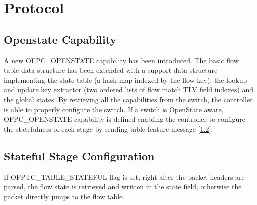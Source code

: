 \chapter{Protocol}
\label{chap:configuration}

\section{Openstate Capability}
\label{sec:capability}
A new OFPC\_OPENSTATE capability has been introduced.
The basic flow table data structure has been extended with a support data structure implementing the state table (a hash map indexed by the flow key), the lookup and update key extractor (two ordered lists of flow match TLV field indexes) and the global states.
By retrieving all the capabilities from the switch, the controller is able to properly configure the switch. If a switch is OpenState aware, OFPC\_OPENSTATE capability is defined enabling the controller to configure the statefulness of each stage by sending table feature message [\ref{sec:table_conf}].

\section{Stateful Stage Configuration}
\label{sec:table_conf}
If OFPTC\_TABLE\_STATEFUL flag is set, right after the packet headers are parsed, the flow state is retrieved and written in the state field, otherwise the packet directly jumps to the flow table. 